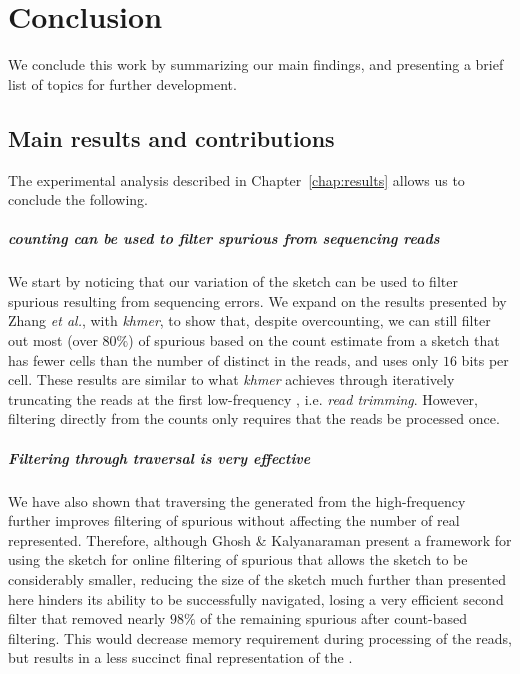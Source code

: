 \chapter{Conclusion}

We conclude this work by summarizing our main findings, and presenting a brief list of topics for further development.

\section{Main results and contributions}

The experimental analysis described in Chapter~\ref{chap:results} allows us to conclude the following.

\paragraph*{ \kmer counting can be used to filter spurious  from sequencing reads}

We start by noticing that our \dBCM variation of the \cm sketch can be used to filter spurious \kmers resulting from sequencing errors.
We expand on the results presented by Zhang \emph{et al.}, with \emph{khmer}, \cite{Zhang2014} to show that, despite overcounting, we can still filter out most (over $80\%$) of spurious  based on the count estimate from a \cm sketch that has fewer cells than the number of distinct  in the reads, and uses only $16$ bits per cell. These results are similar to what \emph{khmer} achieves through iteratively truncating the reads at the first low-frequency \kmer \cite{Zhang2014}, i.e. \emph{read trimming}. However, filtering directly from the counts only requires that the reads be processed once.

\paragraph*{Filtering through traversal is very effective}

We have also shown that traversing the \dBG generated from the high-frequency  further improves filtering of spurious  without affecting the number of real  represented. Therefore, although Ghosh \& Kalyanaraman \cite{Ghosh2019} present a framework for using the \cm sketch for online filtering of spurious  that allows the sketch to be considerably smaller, reducing the size of the \cm sketch much further than presented here hinders its ability to be successfully navigated, losing a very efficient second filter that removed nearly $98\%$ of the remaining spurious  after count-based filtering. This would decrease memory requirement during processing of the reads, but results in a less succinct final representation of the \dBG.

